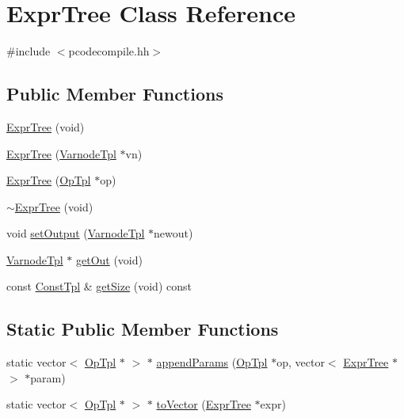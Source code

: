 \hypertarget{class_expr_tree}{}\section{Expr\+Tree Class Reference}
\label{class_expr_tree}


{\ttfamily \#include $<$pcodecompile.\+hh$>$}

\subsection*{Public Member Functions}
\begin{DoxyCompactItemize}
\item 
\mbox{\hyperlink{class_expr_tree_aa5116c3103da19672cdc53dab7aed062}{Expr\+Tree}} (void)
\item 
\mbox{\hyperlink{class_expr_tree_aa147610a3a41ba45d846231854bf8697}{Expr\+Tree}} (\mbox{\hyperlink{class_varnode_tpl}{Varnode\+Tpl}} $\ast$vn)
\item 
\mbox{\hyperlink{class_expr_tree_a4edfd075e30377188d392f0ac87a22de}{Expr\+Tree}} (\mbox{\hyperlink{class_op_tpl}{Op\+Tpl}} $\ast$op)
\item 
\mbox{\hyperlink{class_expr_tree_aec510e931ef659dcd9f6694984be05a1}{$\sim$\+Expr\+Tree}} (void)
\item 
void \mbox{\hyperlink{class_expr_tree_ab8cca7f394b661cc77a309057192fddc}{set\+Output}} (\mbox{\hyperlink{class_varnode_tpl}{Varnode\+Tpl}} $\ast$newout)
\item 
\mbox{\hyperlink{class_varnode_tpl}{Varnode\+Tpl}} $\ast$ \mbox{\hyperlink{class_expr_tree_aa996c79d60e836c6f9062b26cc5f6c69}{get\+Out}} (void)
\item 
const \mbox{\hyperlink{class_const_tpl}{Const\+Tpl}} \& \mbox{\hyperlink{class_expr_tree_a485a318132f134d7f0d4793030dc28c9}{get\+Size}} (void) const
\end{DoxyCompactItemize}
\subsection*{Static Public Member Functions}
\begin{DoxyCompactItemize}
\item 
static vector$<$ \mbox{\hyperlink{class_op_tpl}{Op\+Tpl}} $\ast$ $>$ $\ast$ \mbox{\hyperlink{class_expr_tree_a0c63f868c69166c17663f82f6af8ebbf}{append\+Params}} (\mbox{\hyperlink{class_op_tpl}{Op\+Tpl}} $\ast$op, vector$<$ \mbox{\hyperlink{class_expr_tree}{Expr\+Tree}} $\ast$ $>$ $\ast$param)
\item 
static vector$<$ \mbox{\hyperlink{class_op_tpl}{Op\+Tpl}} $\ast$ $>$ $\ast$ \mbox{\hyperlink{class_expr_tree_ac02d77a8e8d695f150db35768b534181}{to\+Vector}} (\mbox{\hyperlink{class_expr_tree}{Expr\+Tree}} $\ast$expr)
\end{DoxyCompactItemize}
